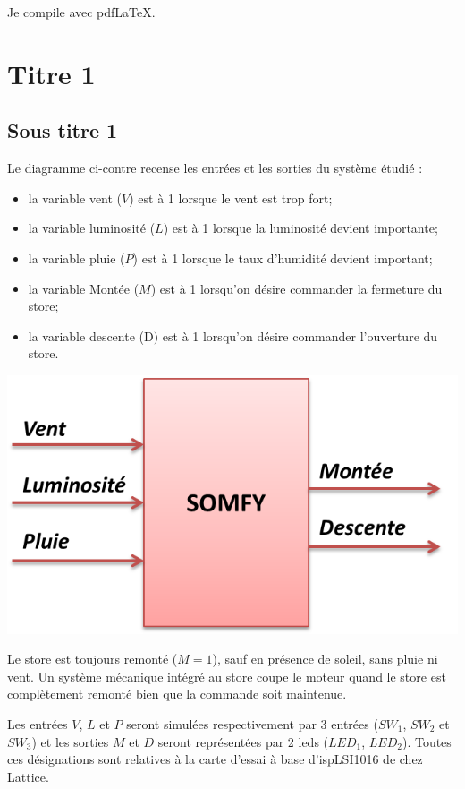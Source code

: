 \documentclass[10pt]{article}
\newif\ifxp
\begin{document}
\ifxp

\else

\fi


\begin{warn}
Je compile avec pdfLaTeX.
\end{warn}
\setlength{\parskip}{0ex plus 0.2ex minus 0ex}
 \renewcommand{\contentsname}{}
 \renewcommand{\baselinestretch}{1}

\tableofcontents

 \renewcommand{\baselinestretch}{1.2}
\setlength{\parskip}{2ex plus 0.5ex minus 0.2ex}



\section{Titre 1}

\subsection{Sous titre 1}

\begin{minipage}[c]{.48\linewidth}
Le diagramme ci-contre recense les entrées et les sorties du système étudié :
\begin{itemize}
\item la variable vent ($V$) est à 1 lorsque le vent est trop fort;
\item la variable luminosité ($L$) est à 1 lorsque la luminosité devient importante;
\item la variable pluie ($P$) est à 1 lorsque le taux d’humidité devient important;
\item la variable Montée ($M$) est à 1 lorsqu’on désire commander la fermeture du store;
\item la variable descente (D$)$ est à 1 lorsqu’on désire commander l’ouverture du store. 
\end{itemize}
\end{minipage} \hfill
\begin{minipage}[c]{.48\linewidth}
\begin{center}
\includegraphics[width=.95\textwidth]{images/ES}
\end{center}
\end{minipage} 
Le store est toujours remonté ($M=1$), sauf en présence de soleil, sans pluie ni vent. Un système mécanique intégré au store coupe le moteur quand le store est complètement remonté bien que la commande soit maintenue.

Les entrées $V$, $L$ et $P$ seront simulées respectivement par 3 entrées ($SW_1$, $SW_2$ et $SW_3$) et les sorties $M$ et $D$ seront représentées par 2 leds ($LED_1$, $LED_2$). Toutes ces désignations sont relatives à la carte d’essai à base d’ispLSI1016 de chez Lattice.
\end{document}
